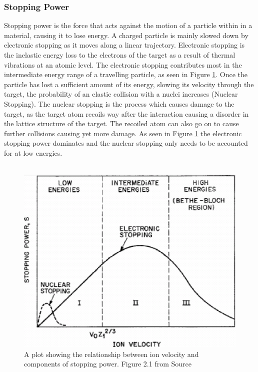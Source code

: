 \documentclass[12pt,a4paper]{article}
\begin{document}
\subsubsection{Stopping Power}
\label{stop}
Stopping power is the force that acts against the motion of a particle within in a material, causing it to lose energy. A charged particle is mainly slowed down by electronic stopping as it moves along a linear trajectory. Electronic stopping is the inelastic energy loss to the electrons of the target as a result of thermal vibrations at an atomic level. The electronic stopping contributes most in the intermediate energy range of a travelling particle, as seen in Figure \ref{stprg}. Once the particle has lost a sufficient amount of its energy, slowing its velocity through the target, the probability of an elastic collision with a nuclei increases (Nuclear Stopping). The nuclear stopping is the process which causes damage to the target, as the target atom recoils way after the interaction causing a disorder in the lattice structure of the target. The recoiled atom can also go on to cause further collisions causing yet more damage. As seen in Figure \ref{stprg} the electronic stopping power dominates and the nuclear stopping only needs to be accounted for at low energies.
\\\\
\begin{figure}[h!]
\centering
\includegraphics[scale=0.4]{Images//Stopping//stoppingrange.png}
\caption[width=\columnwidth]{A plot showing the relationship between ion velocity and components of stopping power. Figure 2.1 from Source \cite{stprg}}
\label{stprg}
\end{figure}
\end{document}
